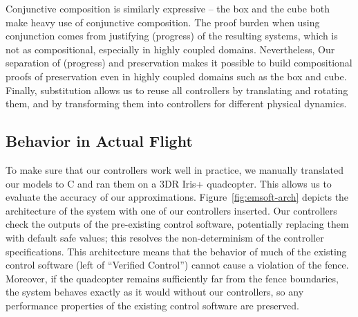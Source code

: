 Conjunctive composition is similarly expressive -- the box and the cube
both make heavy use of conjunctive composition.  The proof burden when
using conjunction comes from justifying \progress{} (progress) of the
resulting systems, which is not as compositional, especially in highly
coupled domains.  Nevertheless, Our separation of \progress{} (progress)
and preservation makes it possible to build compositional proofs of
preservation even in highly coupled domains such as the box and cube.
Finally, substitution allows us to reuse all controllers by translating and
rotating them, and by transforming them into controllers for different
physical dynamics.

\subsection{Behavior in Actual Flight}
\label{sec:flight}
To make sure that our controllers work well in practice, we manually
translated our models to C and ran them on a 3DR Iris+ quadcopter.  This
allows us to evaluate the accuracy of our approximations.
Figure~\ref{fig:emsoft-arch} depicts the architecture of the system with one of
our controllers inserted.  Our controllers check the outputs of the
pre-existing control software, potentially replacing them with default safe
values; this resolves the non-determinism of the controller specifications.
This architecture means that the behavior of much of the existing control
software (left of ``Verified Control'') cannot cause a violation of the
fence.  Moreover, if the quadcopter remains sufficiently far from the fence
boundaries, the system behaves exactly as it would without our controllers,
so any performance properties of the existing control software are
preserved.

